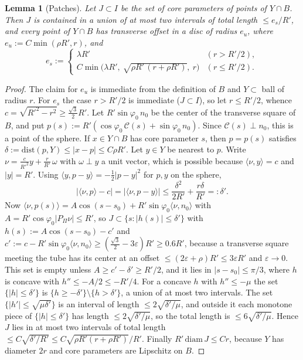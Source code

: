 \documentclass[aps,prx,twocolumn,superscriptaddress,nofootinbib,longbibliography]{revtex4-2}
\theoremstyle{plain}
\newtheorem{lemma}{Lemma}
\theoremstyle{definition}
\theoremstyle{remark}
\begin{document}
\begin{lemma}[Patches]\label{lem:E2}
Let $J\subset I$ be the set of core parameters of points of $Y\cap B$. Then $J$ is contained in a union of at most two intervals of total length $\le e_s/R'$, and every point of $Y\cap B$ has transverse offset in a disc of radius $e_u$, where $e_u:=C\min(\rho R',r)$, and
\[
e_s:=\begin{cases}\lambda R'&(r>R'/2),\\ C\min\big(\lambda R',\ \sqrt{\rho R'\,(r+\rho R')},\ r\big)&(r\le R'/2).\end{cases}
\]
\end{lemma}
\begin{proof}
The claim for $e_u$ is immediate from the definition of $B$ and $Y\subset$ ball of radius $r$. For $e_s$ the case $r>R'/2$ is immediate ($J\subset I$), so let $r\le R'/2$, whence $c=\sqrt{R'^2-r^2}\ge\tfrac{\sqrt3}2R'$. Let $R'\sin\varphi_0\,n_0$ be the center of the transverse square of $B$, and put $p(s):=R'(\cos\varphi_0\,\mathcal C(s)+\sin\varphi_0\,n_0)$. Since $\mathcal C(s)\perp n_0$, this is a point of the sphere. If $x\in Y\cap B$ has core parameter $s$, then $p=p(s)$ satisfies $\delta:=\mathrm{dist}(p,Y)\le|x-p|\le C\rho R'$. Let $y\in Y$ be nearest to $p$. Write $\nu=\tfrac c{R'^2}y+\tfrac r{R'}\,\omega$ with $\omega\perp y$ a unit vector, which is possible because $\langle\nu,y\rangle=c$ and $|y|=R'$. Using $\langle y,p-y\rangle=-\tfrac12|p-y|^2$ for $p,y$ on the sphere,
\[
|\langle\nu,p\rangle-c|=|\langle\nu,p-y\rangle|\le\frac{\delta^2}{2R'}+\frac{r\delta}{R'}=:\delta'.
\]
Now $\langle\nu,p(s)\rangle=A\cos(s-s_0)+R'\sin\varphi_0\langle\nu,n_0\rangle$ with $A=R'\cos\varphi_0|P_\Pi\nu|\le R'$, so $J\subset\{s:|h(s)|\le\delta'\}$ with $h(s):=A\cos(s-s_0)-c'$ and $c':=c-R'\sin\varphi_0\langle\nu,n_0\rangle\ge(\tfrac{\sqrt3}2-3\varepsilon)R'\ge0.6R'$, because a transverse square meeting the tube has its center at an offset $\le(2\varepsilon+\rho)R'\le3\varepsilon R'$ and $\varepsilon\to0$. This set is empty unless $A\ge c'-\delta'\ge R'/2$, and it lies in $|s-s_0|\le\pi/3$, where $h$ is concave with $h''\le-A/2\le-R'/4$. For a concave $h$ with $h''\le-\mu$ the set $\{|h|\le\delta'\}$ is $\{h\ge-\delta'\}\setminus\{h>\delta'\}$, a union of at most two intervals. The set $\{|h'|\le\sqrt{\mu\delta'}\}$ is an interval of length $\le2\sqrt{\delta'/\mu}$, and outside it each monotone piece of $\{|h|\le\delta'\}$ has length $\le2\sqrt{\delta'/\mu}$, so the total length is $\le6\sqrt{\delta'/\mu}$. Hence $J$ lies in at most two intervals of total length $\le C\sqrt{\delta'/R'}\le C\sqrt{\rho R'(r+\rho R')}/R'$. Finally $R'\,\mathrm{diam}\,J\le Cr$, because $Y$ has diameter $2r$ and core parameters are Lipschitz on $B$.
\end{proof}
\end{document}

